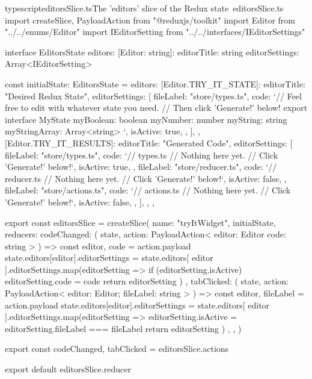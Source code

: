 \documentclass[paper=6in:9in,pagesize=pdftex,headinclude=on,footinclude=on,12pt]{scrbook}
\begin{document}
\begin{codeInput}{typescript}{editorsSlice.ts}{The 'editors' slice of the Redux state\, editorsSlice.ts}
import { createSlice, PayloadAction } from "@reduxjs/toolkit"
import Editor from "../../enums/Editor"
import IEditorSetting from "../../interfaces/IEditorSettings"

interface EditorsState {
  editors: {
    [Editor: string]: {
      editorTitle: string
      editorSettings: Array<IEditorSetting>
    }
  }
}

const initialState: EditorsState = {
  editors: {
    [Editor.TRY_IT_STATE]: {
      editorTitle: "Desired Redux State",
      editorSettings: [
        {
          fileLabel: "store/types.ts",
          code: `// Feel free to edit with whatever state you need.
// Then click 'Generate!' below!
export interface MyState {
  myBoolean: boolean
  myNumber: number
  myString: string
  myStringArray: Array<string>
}`,
          isActive: true,
        },
      ],
    },
    [Editor.TRY_IT_RESULTS]: {
      editorTitle: "Generated Code",
      editorSettings: [
        {
          fileLabel: "store/types.ts",
          code: `// types.ts
// Nothing here yet.
// Click 'Generate!' below!`,
          isActive: true,
        },
        {
          fileLabel: "store/reducer.ts",
          code: `// reducer.ts
// Nothing here yet.
// Click 'Generate!' below!`,
          isActive: false,
        },
        {
          fileLabel: "store/actions.ts",
          code: `// actions.ts
// Nothing here yet.
// Click 'Generate!' below!`,
          isActive: false,
        },
      ],
    },
  },
}

export const editorsSlice = createSlice({
  name: "tryItWidget",
  initialState,
  reducers: {
    codeChanged: (
      state,
      action: PayloadAction<{
        editor: Editor
        code: string
      }>
    ) => {
      const { editor, code } = action.payload
      state.editors[editor].editorSettings = state.editors[
        editor
      ].editorSettings.map(editorSetting => {
        if (editorSetting.isActive) {
          editorSetting.code = code
        }
        return editorSetting
      })
    },
    tabClicked: (
      state,
      action: PayloadAction<{ editor: Editor; fileLabel: string }>
    ) => {
      const { editor, fileLabel } = action.payload
      state.editors[editor].editorSettings = state.editors[
        editor
      ].editorSettings.map(editorSetting => {
        editorSetting.isActive = editorSetting.fileLabel === fileLabel
        return editorSetting
      })
    },
  },
})

export const { codeChanged, tabClicked } = editorsSlice.actions

export default editorsSlice.reducer  
\end{codeInput}
\end{document}
